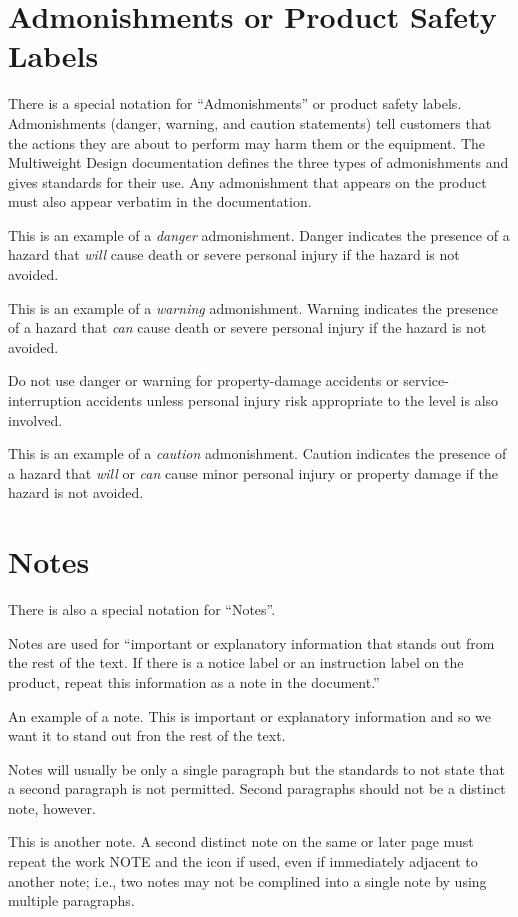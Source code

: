 \section{Admonishments or Product Safety Labels}
There is a special notation for ``Admonishments'' or product safety
labels.  Admonishments 
(danger, warning, and caution statements) tell customers that the
actions they are about to perform may harm them or the equipment.  The
Multiweight Design documentation defines the three types of
admonishments and gives standards for their use.  Any admonishment
that appears on the product must also appear verbatim in the
documentation.  
\begin{danger}
This is an example of a {\it danger} admonishment. Danger indicates
the presence of a hazard that {\it will} cause death or severe
personal injury if the hazard is not avoided.
\end{danger}
\begin{warning}
This is an example of a {\it warning} admonishment.  Warning indicates
the presence of a hazard that {\it can} cause death or severe personal
injury if the hazard is not avoided.
\end{warning}
\begin{note}
Do not use danger or warning for property-damage accidents or
service-interruption accidents unless personal injury risk appropriate
to the level is also involved.
\end{note}
\begin{caution}
This is an example of a {\it caution} admonishment.  Caution indicates the
presence of a hazard that {\it will} or {\it can} cause minor personal
injury or property damage if the hazard is not avoided.
\end{caution}

\section{Notes }

There is also a special notation for ``Notes''. 

Notes
are used for ``important or explanatory information that stands out
from the rest of the text. If there is a notice label or an
instruction label on the product, repeat this information as a note in
the document.''


\begin{note}An example of a note.  This is important or explanatory
  information and so we want it to stand out fron the rest of the text.

Notes will usually be only a single paragraph but the standards to not
state that a second paragraph is not permitted.  Second paragraphs
should not be a distinct note, however.
\end{note}
\begin{note}
This is another note.  A second distinct note on the same or later
page must repeat the work 
NOTE and the icon if used, even if immediately adjacent to another
note; i.e., two notes may not be complined into a single note by using
multiple paragraphs.
\end{note}


